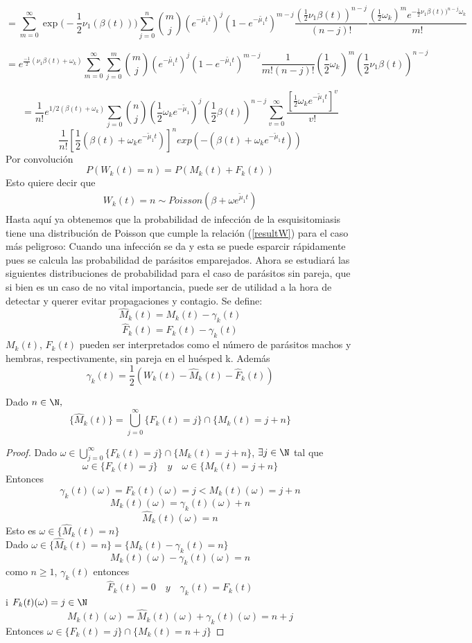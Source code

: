 $$=\sum_{m=0}^\infty\exp\bigg(-\frac{1}{2}\nu_1(\beta(t))\bigg)\sum_{j=0}^n{m \choose j}(e^{-\tilde{\mu_1}t})^j(1-e^{-\tilde{\mu_1}t})^{m-j}\frac{(\frac{1}{2}\nu_1\beta(t))^{n-j}}{(n-j)!}\frac{(\frac{1}{2}\omega_k)^m e^{-\frac{1}{2}\nu_1\beta(t))^{n-j}\omega_k}}{m!}$$ 

$$=e^{\frac{-1}{2}(\nu_1\beta(t)+\omega_k)}\sum_{m=0}^\infty\sum_{j=0}^m{m \choose j}(e^{-\tilde{\mu_1}t})^j(1-e^{-\tilde{\mu_1}t})^{m-j}\frac{1}{m!(n-j)!}(\frac{1}{2}\omega_k)^m(\frac{1}{2}\nu_1\beta(t))^{n-j}$$

$$=\frac{1}{n!}e^{1/2(\beta(t)+\omega_k)} \sum_{j=0}{n\choose j}(\frac{1}{2}\omega_k e^{-\tilde{\mu}_1})^j(\frac{1}{2}\beta(t))^{n-j}\sum_{v=0}^\infty\frac{[\frac{1}{2}\omega_k e^{-\tilde{\mu}_1t}]^v}{v!}  $$
$$\frac{1}{n!}[\frac{1}{2}(\beta(t)+\omega_k e^{-\tilde{\mu}_1t})]^n exp(-(\beta(t)+\omega_k e^{-\tilde{\mu}_1}t) ) $$
Por convolución $$P(W_k(t)=n)=P(M_k(t)+F_k(t))$$
Esto quiere decir que 
\begin{eqnarray}
\label{resultW}
    W_k(t)=n\sim Poisson(\beta+\omega e^{\tilde{\mu}_1 t})
\end{eqnarray}
Hasta aquí ya obtenemos que la probabilidad de infección de la esquisitomiasis tiene una distribución de Poisson que cumple la relación (\ref{resultW}) para el caso más peligroso: Cuando una infección se da y esta se puede esparcir rápidamente pues se calcula las probabilidad de parásitos emparejados.
Ahora se estudiará las siguientes distribuciones de probabilidad para el caso de parásitos sin pareja, que si bien es un caso de no vital importancia, puede ser de utilidad a la hora de detectar y querer evitar propagaciones y contagio.
Se define: $$\hat{M}_k(t)=M_k(t)-\gamma_k(t)$$
$$\hat{F}_k(t)=F_k(t)-\gamma_k(t)$$
$M_k(t)$, $F_k(t)$ pueden ser interpretados como el número de parásitos machos y hembras, respectivamente, sin pareja en el huésped k.
Además $$\gamma_k(t)=\frac{1}{2}(W_k(t)-\hat{M}_k(t)-\hat{F}_k(t) )$$
\begin{Lem}
    Dado $n\in\N,$
    $$\{\hat{M}_k(t)\}=\bigcup_{j=0}^\infty \{F_k(t)=j\}\cap\{M_k(t)=j+n\}$$
    \begin{proof}
        Dado $\omega\in\bigcup_{j=0}^\infty \{F_k(t)=j\}\cap\{M_k(t)=j+n\}$, $\exists j\in\N$ tal que $$\omega\in\{F_k(t)=j\}\quad y \quad\omega\in\{M_k(t)=j+n\}$$
        Entonces $$\gamma_k(t)(\omega)=F_k(t)(\omega)=j<M_k(t)(\omega)=j+n$$
        $$M_k(t)(\omega)=\gamma_k(t)(\omega)+n$$
        $$\hat{M}_k(t)(\omega)=n$$
        Esto es $\omega\in\{\hat{M}_k(t)=n\}$\\
        Dado $\omega\in\{\hat{M}_k(t)=n\}=\{M_k(t)-\gamma_k(t)=n\}$\\$$M_k(t)(\omega)-\gamma_k(t)(\omega)=n$$
        como $n\geq 1$, $\gamma_k(t)$ entonces $$\hat{F}_k(t)=0\quad y \quad \gamma_k(t)=F_k(t)$$
        i $F_k(t)(\omega)=j\in\N$
        $$M_k(t)(\omega)=\hat{M}_k(t)(\omega)+\gamma_k(t)(\omega)=n+j$$
        Entonces $\omega\in\{F_k(t)=j\}\cap\{M_k(t)=n+j\}$
    \end{proof}
\end{Lem}
